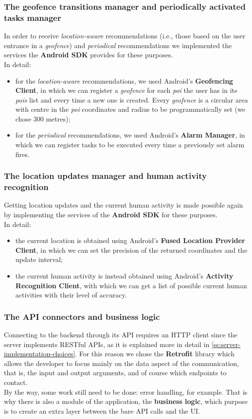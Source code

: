 \documentclass[../../main]{subfiles}
\begin{document}
\subsubsection{The geofence transitions manager and periodically activated tasks manager}
In order to receive \textit{location-aware} recommendations (i.e., those based on the user entrance in a \textit{geofence}) and \textit{periodical} recommendations we implemented the services the \textbf{Android SDK} provides for these purposes.\\
In detail:
\begin{itemize}
    \item for the \textit{location-aware} recommendations, we used Android's \textbf{Geofencing Client}, in which we can register a \textit{geofence} for each \textit{poi} the user has in its \textit{pois} list and every time a new one is created.
    Every \textit{geofence} is a circular area with centre in the \textit{poi} coordinates and radius to be programmatically set (we chose 300 metres);
    \item for the \textit{periodical} recommendations, we used Android's \textbf{Alarm Manager}, in which we can register tasks to be executed every time a previously set alarm fires.
\end{itemize}

\subsubsection{The location updates manager and human activity recognition}
Getting location updates and the current human activity is made possible again by implementing the services of the \textbf{Android SDK} for these purposes.\\
In detail:
\begin{itemize}
    \item the current location is obtained using Android's \textbf{Fused Location Provider Client}, in which we can set the precision of the returned coordinates and the update interval;
    \item the current human activity is instead obtained using Android's \textbf{Activity Recognition Client}, with which we can get a list of possible current human activities with their level of accuracy.
\end{itemize}

\subsubsection{The API connectors and business logic}
Connecting to the backend through its API requires an HTTP client since the server implements RESTful APIs, as it is explained more in detail in \ref{ss:server-implementation-choices}.
For this reason we chose the \textbf{Retrofit} library which allows the developer to focus mainly on the data aspect of the communication, that is, the input and output arguments, and of course which endpoints to contact.\\
By the way, some work still need to be done: error handling, for example. That is why there is also a module of the application, the \textbf{business logic}, which purpose is to create an extra layer between the bare API calls and the UI.
\end{document}
